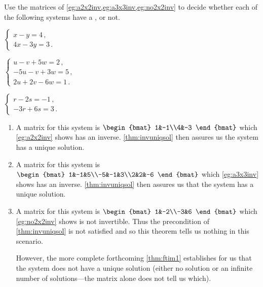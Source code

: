 \begin{example} 
Use the matrices of \cref{eg:a2x2inv,eg:a3x3inv,eg:no2x2inv} to decide whether each of the following systems have a , or not.
\begin{Parts}
\item \(\begin{cases}
x-y=4\,,\\4x-3y=3\,.
\end{cases}\)
\item \(\begin{cases}
u-v+5w=2\,,\\ -5u-v+3w=5\,,\\ 2u+2v-6w=1\,.
\end{cases}\)
\item \(\begin{cases}
r-2s=-1\,,\\-3r+6s=3\,.
\end{cases}\)
\end{Parts}
\begin{solution} 
\begin{enumerate}
\item A matrix for this system is \(\begin{bmat} 1&-1\\4&-3 \end{bmat}\) which \cref{eg:a2x2inv} shows has an inverse.  
\cref{thm:invuniqsol} then assures us the system has a unique solution.
\item A matrix for this system is \(\begin{bmat} 1&-1&5\\-5&-1&3\\2&2&-6 \end{bmat}\) which \cref{eg:a3x3inv} shows has an inverse.  
\cref{thm:invuniqsol} then assures us that the system has a unique solution.
\item A matrix for this system is \(\begin{bmat} 1&-2\\-3&6 \end{bmat}\) which \cref{eg:no2x2inv} shows is not invertible.  
Thus the precondition of \cref{thm:invuniqsol} is not satisfied and so this theorem tells us nothing in this scenario.

However, the more complete forthcoming \cref{thm:ftim1} establishes for us that the system does not have a unique solution (either no solution or an infinite number of solutions---the matrix alone does not tell us which).
\end{enumerate}
\end{solution}
\end{example}






